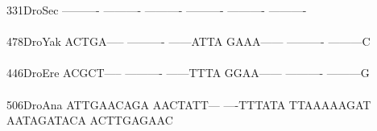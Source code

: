 \documentclass[11pt,twoside,reqno,a4paper]{article}
\begin{document}
{331\hspace*{2\charwidth}DroSec	----------	----------	----------	----------	----------	----------	\\
\hspace*{5\charwidth}\hspace*{7\charwidth}\hspace*{1\charwidth}\hspace*{1\charwidth}\hspace*{1\charwidth}\hspace*{1\charwidth}\hspace*{1\charwidth}\hspace*{1\charwidth}\\
478\hspace*{2\charwidth}DroYak	ACTGA-----	----------	------ATTA	GAAA------	----------	---------C	\\
\hspace*{5\charwidth}\hspace*{7\charwidth}\hspace*{1\charwidth}\hspace*{1\charwidth}\hspace*{1\charwidth}\hspace*{1\charwidth}\hspace*{1\charwidth}\hspace*{1\charwidth}\\
446\hspace*{2\charwidth}DroEre	ACGCT-----	----------	------TTTA	GGAA------	----------	---------G	\\
\hspace*{5\charwidth}\hspace*{7\charwidth}\hspace*{1\charwidth}\hspace*{1\charwidth}\hspace*{1\charwidth}\hspace*{1\charwidth}\hspace*{1\charwidth}\hspace*{1\charwidth}\\
506\hspace*{2\charwidth}DroAna	ATTGAACAGA	AACTATT---	----TTTATA	TTAAAAAGAT	AATAGATACA	ACTTGAGAAC	\\
\hspace*{5\charwidth}\hspace*{7\charwidth}\hspace*{1\charwidth}\hspace*{1\charwidth}\hspace*{1\charwidth}\hspace*{1\charwidth}\hspace*{1\charwidth}\hspace*{1\charwidth}\\
}
\end{document}
